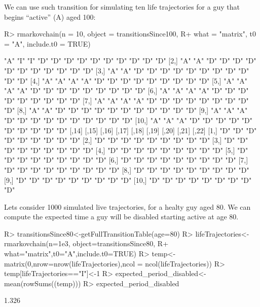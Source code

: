 \documentclass[
  nojss]{jss}
\begin{document}
We can use such transition for simulating ten life trajectories for a guy that begins ``active'' (A) aged 100:

\begin{CodeChunk}

\begin{CodeInput}
R> rmarkovchain(n = 10, object = transitionsSince100,
R+              what = "matrix", t0 = "A", include.t0 = TRUE)
\end{CodeInput}

\begin{CodeOutput}
      [,1] [,2] [,3] [,4] [,5] [,6] [,7] [,8] [,9] [,10] [,11] [,12] [,13]
 [1,] "A"  "I"  "I"  "D"  "D"  "D"  "D"  "D"  "D"  "D"   "D"   "D"   "D"  
 [2,] "A"  "A"  "D"  "D"  "D"  "D"  "D"  "D"  "D"  "D"   "D"   "D"   "D"  
 [3,] "A"  "A"  "D"  "D"  "D"  "D"  "D"  "D"  "D"  "D"   "D"   "D"   "D"  
 [4,] "A"  "A"  "A"  "A"  "D"  "D"  "D"  "D"  "D"  "D"   "D"   "D"   "D"  
 [5,] "A"  "A"  "A"  "A"  "D"  "D"  "D"  "D"  "D"  "D"   "D"   "D"   "D"  
 [6,] "A"  "A"  "A"  "A"  "D"  "D"  "D"  "D"  "D"  "D"   "D"   "D"   "D"  
 [7,] "A"  "A"  "A"  "A"  "D"  "D"  "D"  "D"  "D"  "D"   "D"   "D"   "D"  
 [8,] "A"  "A"  "D"  "D"  "D"  "D"  "D"  "D"  "D"  "D"   "D"   "D"   "D"  
 [9,] "A"  "A"  "A"  "D"  "D"  "D"  "D"  "D"  "D"  "D"   "D"   "D"   "D"  
[10,] "A"  "A"  "A"  "D"  "D"  "D"  "D"  "D"  "D"  "D"   "D"   "D"   "D"  
      [,14] [,15] [,16] [,17] [,18] [,19] [,20] [,21] [,22]
 [1,] "D"   "D"   "D"   "D"   "D"   "D"   "D"   "D"   "D"  
 [2,] "D"   "D"   "D"   "D"   "D"   "D"   "D"   "D"   "D"  
 [3,] "D"   "D"   "D"   "D"   "D"   "D"   "D"   "D"   "D"  
 [4,] "D"   "D"   "D"   "D"   "D"   "D"   "D"   "D"   "D"  
 [5,] "D"   "D"   "D"   "D"   "D"   "D"   "D"   "D"   "D"  
 [6,] "D"   "D"   "D"   "D"   "D"   "D"   "D"   "D"   "D"  
 [7,] "D"   "D"   "D"   "D"   "D"   "D"   "D"   "D"   "D"  
 [8,] "D"   "D"   "D"   "D"   "D"   "D"   "D"   "D"   "D"  
 [9,] "D"   "D"   "D"   "D"   "D"   "D"   "D"   "D"   "D"  
[10,] "D"   "D"   "D"   "D"   "D"   "D"   "D"   "D"   "D"  
\end{CodeOutput}
\end{CodeChunk}

Lets consider 1000 simulated live trajectories, for a healty guy aged 80. We can compute the expected time a guy will be disabled starting active at age 80.

\begin{CodeChunk}

\begin{CodeInput}
R> transitionsSince80<-getFullTransitionTable(age=80)
R> lifeTrajectories<-rmarkovchain(n=1e3, object=transitionsSince80,
R+                                what="matrix",t0="A",include.t0=TRUE)
R> temp<-matrix(0,nrow=nrow(lifeTrajectories),ncol = ncol(lifeTrajectories))
R> temp[lifeTrajectories=="I"]<-1
R> expected_period_disabled<-mean(rowSums((temp)))
R> expected_period_disabled
\end{CodeInput}

\begin{CodeOutput}
[1] 1.326
\end{CodeOutput}
\end{CodeChunk}
\end{document}

